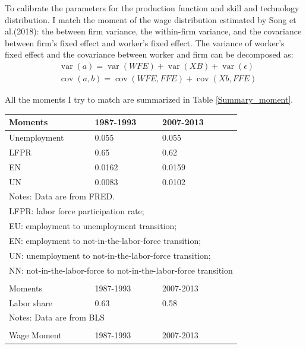 \documentclass[12pt]{article}
\newcommand{\1}{\mathbb{1}}
\DeclareMathOperator{\var}{var}
\DeclareMathOperator{\cov}{cov}
\begin{document}
To calibrate the parameters for the production function and skill and technology distribution. I match the moment of the wage distribution estimated by Song et al.(2018)\nocite{Songetal2018}: the between firm variance, the within-firm variance, and the covariance between firm's fixed effect and worker's fixed effect. The variance of worker's fixed effect and the covariance between worker and firm can be decomposed as: 
\begin{align*}
& \var(a) =\var(WFE) + \var(XB) +\var(\epsilon) \\
& \cov(a,b) = \cov(WFE,FFE)+\cov(Xb,FFE)
\end{align*}

All the moments I try to match are summarized in Table \ref{Summary_moment}. \\

\begin{table}[h!]
\scriptsize
\center
\begin{tabular}{l|lll}
\hline \hline
Moments            & 1987-1993     & 2007-2013      		\\
\hline 
Unemployment		&	0.055	&	0.055 		\\
LFPR 						& 0.65 		& 0.62			\\
EN     						& 0.0162 	& 0.0159     	\\
UN 					& 0.0083 		& 0.0102        	\\
\hline
\multicolumn{4}{l}{Notes: Data are from FRED.} \\
\multicolumn{4}{l}{LFPR: labor force participation rate;} \\
\multicolumn{4}{l}{EU: employment to unemployment transition;} \\
\multicolumn{4}{l}{EN: employment to not-in-the-labor-force transition;} \\
\multicolumn{4}{l}{UN: unemployment to not-in-the-labor-force transition;} \\
\multicolumn{4}{l}{NN: not-in-the-labor-force to not-in-the-labor-force transition} \\
\multicolumn{4}{c}{} \\
\hline \hline
Moments            & 1987-1993     & 2007-2013      		\\
\hline 
Labor share     & 0.63 & 0.58        						\\
\hline
\multicolumn{4}{l}{Notes: Data are from BLS} \\
\multicolumn{4}{c}{} \\
\hline \hline
Wage Moment           &1987-1993     & 2007-2013      		\\

\end{tabular}
\end{table}
\end{document}

